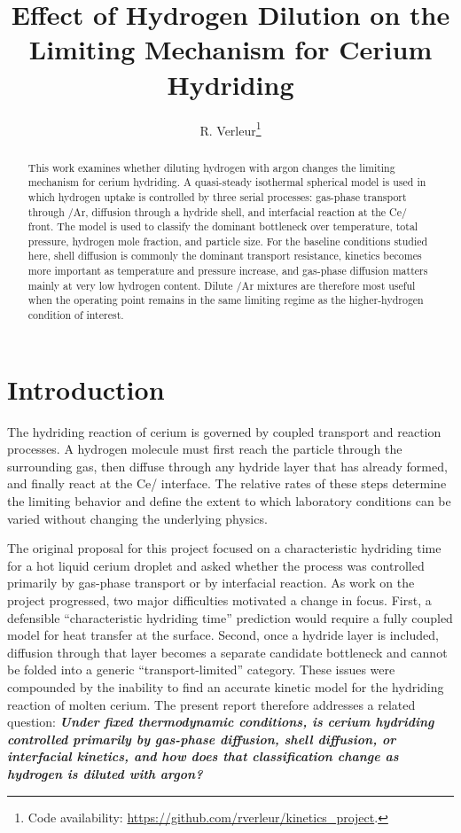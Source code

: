 \documentclass[11pt]{article}
\title{Effect of Hydrogen Dilution on the Limiting Mechanism for Cerium Hydriding}
\author{R. Verleur\thanks{Code availability: \url{https://github.com/rverleur/kinetics_project}.}}
\date{}
\begin{document}
\maketitle
\vspace{-1.2em}

\begin{abstract}
This work examines whether diluting hydrogen with argon changes the limiting
mechanism for cerium hydriding. A quasi-steady isothermal spherical model is
used in which hydrogen uptake is controlled by three serial processes:
gas-phase transport through /Ar, diffusion through a hydride shell, and
interfacial reaction at the Ce/ front. The model is used to classify
the dominant bottleneck over temperature, total pressure, hydrogen mole
fraction, and particle size. For the baseline conditions studied here, shell
diffusion is commonly the dominant transport resistance, kinetics becomes more
important as temperature and pressure increase, and gas-phase diffusion matters
mainly at very low hydrogen content. Dilute /Ar mixtures are therefore
most useful when the operating point remains in the same limiting regime as the
higher-hydrogen condition of interest.
\end{abstract}

\section{Introduction}

The hydriding reaction of cerium is governed by coupled transport and reaction
processes. A hydrogen molecule must first reach the particle through the
surrounding gas, then diffuse through any hydride layer that has already
formed, and finally react at the Ce/ interface. The relative rates of
these steps determine the limiting behavior and define the extent to which
laboratory conditions can be varied without changing the underlying physics.

The original proposal for this project focused on a characteristic hydriding
time for a hot liquid cerium droplet and asked whether the process was
controlled primarily by gas-phase transport or by interfacial reaction. As
work on the project progressed, two major difficulties motivated a change in
focus. First, a defensible ``characteristic hydriding time'' prediction would
require a fully coupled model for heat transfer at the surface. Second, once a
hydride layer is included, diffusion through that layer becomes a separate
candidate bottleneck and cannot be folded into a generic
``transport-limited'' category. These issues were compounded by the inability
to find an accurate kinetic model for the hydriding reaction of molten cerium.
The present report therefore addresses a related question:
\textbf{\textit{Under fixed thermodynamic conditions, is cerium hydriding controlled
primarily by gas-phase diffusion, shell diffusion, or interfacial kinetics, and
how does that classification change as hydrogen is diluted with argon?}}
\end{document}

